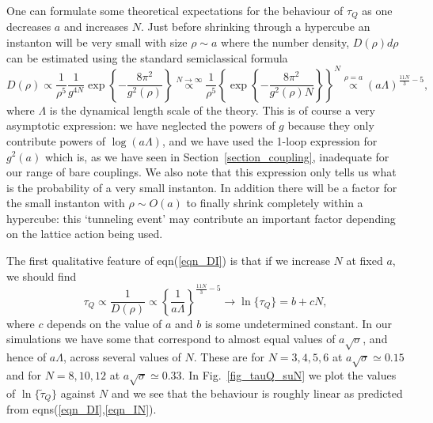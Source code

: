 \documentclass[12pt]{article}
\begin{document}
One can formulate some theoretical expectations for the behaviour of $\tau_Q$ as one decreases
$a$ and increases $N$. Just before shrinking through a hypercube an instanton will be very small
with size $\rho \sim a$ where the number density, $D(\rho)d\rho$  can be estimated using the
standard semiclassical formula
%
\cite{Coleman_Q}
%
\begin{equation}
D(\rho) \propto \frac{1}{\rho^5}
  \frac{1}{g^{4N}}
  \exp\left\{-\frac{8\pi^2}{g^2(\rho)}\right\}
    \stackrel{N\to\infty}{\propto}
 \frac{1}{\rho^5}\left\{ 
  \exp\left\{-\frac{8\pi^2}{g^2(\rho)N}
    \right\}\right\}^N
    \stackrel{\rho = a}{\propto}
 \left(a\Lambda\right)^{\frac{11N}{3}-5},  
\label{eqn_DI}
\end{equation}
%
where $\Lambda$ is the dynamical length scale of the theory. This is of
course a very asymptotic expression: we have neglected the powers of $g$ because they only
contribute powers of $\log(a\Lambda)$, and we have used the 1-loop expression for $g^2(a)$ which
is, as we have seen in Section~\ref{section_coupling}, inadequate for our range of
bare couplings. We also note that this expression only tells us what is the probability
of a very small instanton. In addition there will be a factor for the small instanton with
$\rho \sim O(a)$ to finally shrink completely within a hypercube: this `tunneling event' may
contribute an important factor depending on the lattice action being used.

The first qualitative feature of eqn(\ref{eqn_DI}) is that if we increase $N$ at
fixed $a$, we should find 
%
\begin{equation}
  \tau_Q \propto \frac{1}{D(\rho)} \propto \left\{\frac{1}{a\Lambda}\right\}^{\frac{11N}{3}-5}
\longrightarrow
  \ln\{\tau_Q\} = b + c N,
\label{eqn_IN}
\end{equation}
%
where $c$ depends on the value of $a$ and $b$ is some undetermined constant. In our
simulations we have some that correspond to almost equal values of $a\surd\sigma$, and hence of
$a\Lambda$, across several values of $N$. These are for $N=3,4,5,6$ at $a\surd\sigma \simeq 0.15$
and for $N=8,10,12$ at  $a\surd\sigma \simeq 0.33$. In Fig.~\ref{fig_tauQ_suN}
we plot the values of $\ln\{\tilde{\tau}_Q\}$ against $N$ and we see that the
behaviour is roughly linear as predicted from eqns(\ref{eqn_DI},\ref{eqn_IN}).
\end{document}

